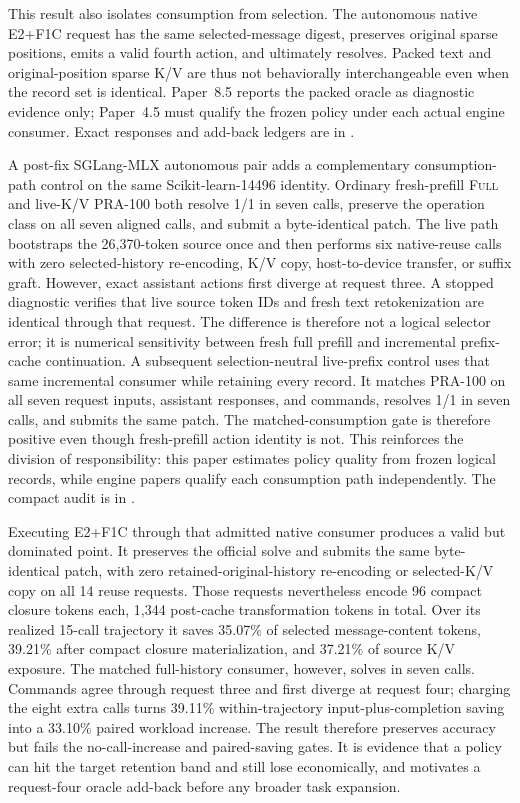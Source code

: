 \documentclass[11pt]{article}
\begin{document}
This result also isolates consumption from selection.  The autonomous native
E2+F1C request has the same selected-message digest, preserves original sparse
positions, emits a valid fourth action, and ultimately resolves.  Packed text
and original-position sparse K/V are thus not behaviorally interchangeable
even when the record set is identical.  Paper~8.5 reports the packed oracle as
diagnostic evidence only; Paper~4.5 must qualify the frozen policy under each
actual engine consumer.  Exact responses and add-back ledgers are in
.

A post-fix SGLang-MLX autonomous pair adds a complementary consumption-path
control on the same Scikit-learn-14496 identity.  Ordinary fresh-prefill
\textsc{Full} and live-K/V PRA-100 both resolve 1/1 in seven calls, preserve the
operation class on all seven aligned calls, and submit a byte-identical patch.
The live path bootstraps the 26,370-token source once and then performs six
native-reuse calls with zero selected-history re-encoding, K/V copy,
host-to-device transfer, or suffix graft.  However, exact assistant actions
first diverge at request three.  A stopped diagnostic verifies that live source
token IDs and fresh text retokenization are identical through that request.
The difference is therefore not a logical selector error; it is numerical
sensitivity between fresh full prefill and incremental prefix-cache
continuation.  A subsequent selection-neutral live-prefix control uses that
same incremental consumer while retaining every record.  It matches PRA-100
on all seven request inputs, assistant responses, and commands, resolves 1/1
in seven calls, and submits the same patch.  The matched-consumption gate is
therefore positive even though fresh-prefill action identity is not.  This
reinforces the division of
responsibility: this paper estimates policy quality from frozen logical
records, while engine papers qualify each consumption path independently.  The
compact audit is in
.

Executing E2+F1C through that admitted native consumer produces a valid but
dominated point.  It preserves the official solve and submits the same
byte-identical patch, with zero retained-original-history re-encoding or
selected-K/V copy on all 14 reuse requests.  Those requests nevertheless encode
96 compact closure tokens each, 1,344 post-cache transformation tokens in
total.  Over its realized 15-call trajectory it saves
35.07\% of selected message-content tokens, 39.21\% after compact closure
materialization, and 37.21\% of source K/V exposure.  The matched full-history
consumer, however, solves in seven calls.  Commands agree through request
three and first diverge at request four; charging the eight extra calls turns
39.11\% within-trajectory input-plus-completion saving into a 33.10\% paired
workload increase.  The result therefore preserves accuracy but fails the
no-call-increase and paired-saving gates.  It is evidence that a policy can
hit the target retention band and still lose economically, and motivates a
request-four oracle add-back before any broader task expansion.
\end{document}
